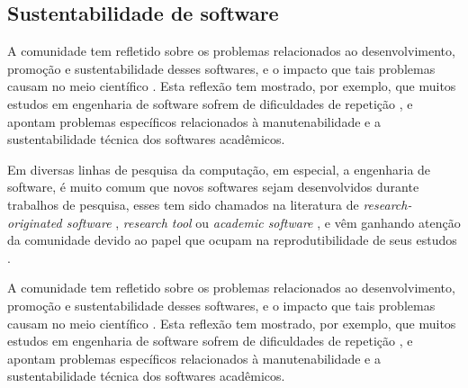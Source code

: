 \subsection{Sustentabilidade de software} \label{sustentabilidade}

%
%
%

A comunidade tem refletido sobre os problemas relacionados ao
desenvolvimento, promoção e sustentabilidade desses softwares, e o
impacto que tais problemas causam no meio científico \cite{allen2017engineering}. Esta
reflexão tem mostrado, por exemplo, que muitos estudos em engenharia de
software sofrem de dificuldades de repetição \cite{Tang2016}, e apontam
problemas específicos relacionados à manutenabilidade e a sustentabilidade
técnica dos softwares acadêmicos.

Em diversas linhas de pesquisa da computação, em especial, a engenharia de
software, é muito comum que novos softwares sejam desenvolvidos durante
trabalhos de pesquisa, esses tem sido chamados na literatura de {\it
research-originated software} \cite{Kon2011}, {\it research tool}
\cite{Portillo12} ou {\it academic software} \cite{allen2017engineering}, e vêm
ganhando atenção da comunidade devido ao papel que ocupam na reprodutibilidade
de seus estudos \cite{Peng2011}.

A comunidade tem refletido sobre os problemas relacionados ao
desenvolvimento, promoção e sustentabilidade desses softwares, e o
impacto que tais problemas causam no meio científico \cite{allen2017engineering}. Esta
reflexão tem mostrado, por exemplo, que muitos estudos em engenharia de
software sofrem de dificuldades de repetição \cite{Tang2016}, e apontam
problemas específicos relacionados à manutenabilidade e a sustentabilidade
técnica dos softwares acadêmicos.

